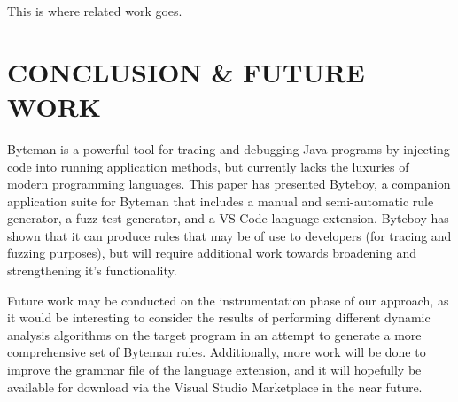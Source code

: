 \documentclass[letterpaper,twocolumn,10pt]{article}
\begin{document}
This is where related work goes. \\

\section{CONCLUSION \& FUTURE WORK}

Byteman is a powerful tool for tracing and debugging Java programs by injecting code into running application methods, but currently lacks the luxuries of modern programming languages. This paper has presented Byteboy, a companion application suite for Byteman that includes a manual and semi-automatic rule generator, a fuzz test generator, and a VS Code language extension. Byteboy has shown that it can produce rules that may be of use to developers (for tracing and fuzzing purposes), but will require additional work towards broadening and strengthening it's functionality.

Future work may be conducted on the instrumentation phase of our approach, as it would be interesting to consider the results of performing different dynamic analysis algorithms on the target program in an attempt to generate a more comprehensive set of Byteman rules. Additionally, more work will be done to improve the grammar file of the language extension, and it will hopefully be available for download via the Visual Studio Marketplace in the near future.
\end{document}
